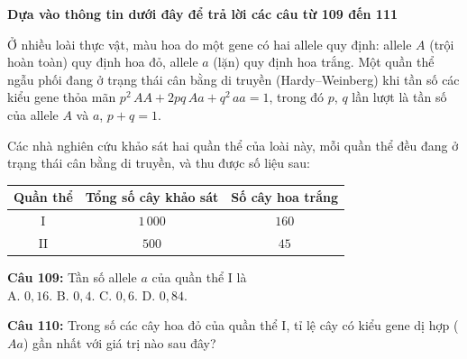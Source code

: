 \documentclass[12pt,a4paper]{article}
\begin{document}


\vspace{0.5cm}
\noindent\textbf{Dựa vào thông tin dưới đây để trả lời các câu từ 109 đến 111}%


\par\nobreak

Ở nhiều loài thực vật, màu hoa do một gene có hai allele quy định: allele $A$ (trội hoàn toàn) quy định hoa đỏ, allele $a$ (lặn) quy định hoa trắng. Một quần thể ngẫu phối đang ở trạng thái cân bằng di truyền (Hardy--Weinberg) khi tần số các kiểu gene thỏa mãn $p^2\,AA+2pq\,Aa+q^2\,aa=1$, trong đó $p$, $q$ lần lượt là tần số của allele $A$ và $a$, $p+q=1$.

Các nhà nghiên cứu khảo sát hai quần thể của loài này, mỗi quần thể đều đang ở trạng thái cân bằng di truyền, và thu được số liệu sau:

\begin{center}
\begin{tabular}{|c|c|c|}
\hline
Quần thể & Tổng số cây khảo sát & Số cây hoa trắng \\ \hline
I & $1\,000$ & $160$ \\ \hline
II & $500$ & $45$ \\ \hline
\end{tabular}
\end{center}

\par\nobreak


\noindent \textbf{Câu 109:} Tần số allele $a$ của quần thể I là\\
\noindent A. $0{,}16$. \hfill B. $0{,}4$. \hfill C. $0{,}6$. \hfill D. $0{,}84$.



\vspace{0.3cm}

\noindent \textbf{Câu 110:} Trong số các cây hoa đỏ của quần thể I, tỉ lệ cây có kiểu gene dị hợp ($Aa$) gần nhất với giá trị nào sau đây?\\
\noindent{}



\vspace{0.3cm}
\end{document}
